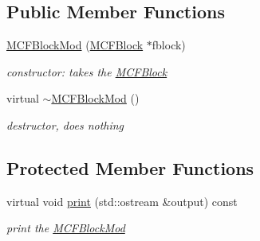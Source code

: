 \subsection*{Public Member Functions}
\begin{DoxyCompactItemize}
\item 
\mbox{\label{class_s_m_spp__di__unipi__it_1_1_m_c_f_block_mod_a8220157662ded9fa629ac09330343818}} 
\mbox{\hyperlink{class_s_m_spp__di__unipi__it_1_1_m_c_f_block_mod_a8220157662ded9fa629ac09330343818}{M\+C\+F\+Block\+Mod}} (\mbox{\hyperlink{class_s_m_spp__di__unipi__it_1_1_m_c_f_block}{M\+C\+F\+Block}} $\ast$fblock)
\begin{DoxyCompactList}\small\item\em constructor\+: takes the \mbox{\hyperlink{class_s_m_spp__di__unipi__it_1_1_m_c_f_block}{M\+C\+F\+Block}} \end{DoxyCompactList}\item 
\mbox{\label{class_s_m_spp__di__unipi__it_1_1_m_c_f_block_mod_a1c707806bdc94fadcb5dca23212220bc}} 
virtual \mbox{\hyperlink{class_s_m_spp__di__unipi__it_1_1_m_c_f_block_mod_a1c707806bdc94fadcb5dca23212220bc}{$\sim$\+M\+C\+F\+Block\+Mod}} ()
\begin{DoxyCompactList}\small\item\em destructor, does nothing \end{DoxyCompactList}\end{DoxyCompactItemize}
\subsection*{Protected Member Functions}
\begin{DoxyCompactItemize}
\item 
\mbox{\label{class_s_m_spp__di__unipi__it_1_1_m_c_f_block_mod_a2e7b9c9148a98c5c342e8c25cac95926}} 
virtual void \mbox{\hyperlink{class_s_m_spp__di__unipi__it_1_1_m_c_f_block_mod_a2e7b9c9148a98c5c342e8c25cac95926}{print}} (std\+::ostream \&output) const
\begin{DoxyCompactList}\small\item\em print the \mbox{\hyperlink{class_s_m_spp__di__unipi__it_1_1_m_c_f_block_mod}{M\+C\+F\+Block\+Mod}} \end{DoxyCompactList}\end{DoxyCompactItemize}
